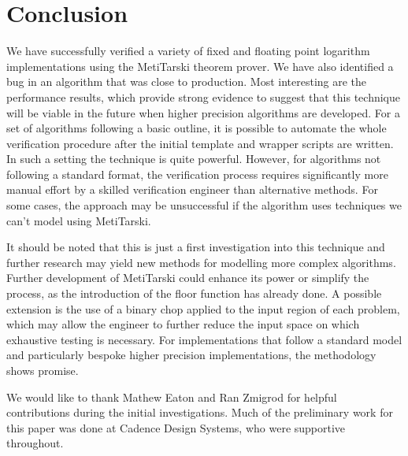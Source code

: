 \documentclass[smallcondensed]{svjour3}
\begin{document}
\section{Conclusion}
\label{Conclusion}
We have successfully verified a variety of fixed and floating point logarithm implementations using the MetiTarski theorem prover.
We have also identified a bug in an algorithm that was close to production. Most interesting are the performance results, which provide strong evidence to suggest that this technique will be viable in the future when higher precision algorithms are developed. For a set of algorithms following a basic outline, it is possible to automate the whole verification procedure after the initial template and wrapper scripts are written. In such a setting the technique is quite powerful. However, for algorithms not following a standard format, the verification process requires significantly more manual effort by a skilled verification engineer than alternative methods. For some cases, the approach may be unsuccessful if the algorithm uses techniques we can't model using MetiTarski. 

It should be noted that this is just a first investigation into this technique and further research may yield new methods for modelling more complex algorithms. Further development of MetiTarski could enhance its power or simplify the process, as the introduction of the floor function has already done. A possible extension is the use of a binary chop applied to the input region of each problem, which may allow the engineer to further reduce the input space on which exhaustive testing is necessary. For implementations that follow a standard model and particularly bespoke higher precision implementations, the methodology shows promise.

\begin{acknowledgements}
We would like to thank Mathew Eaton and Ran Zmigrod for helpful contributions during the initial investigations. Much of the preliminary work for this paper was done at Cadence Design Systems, who were supportive throughout. 
\end{acknowledgements}
   
  
\end{document}

